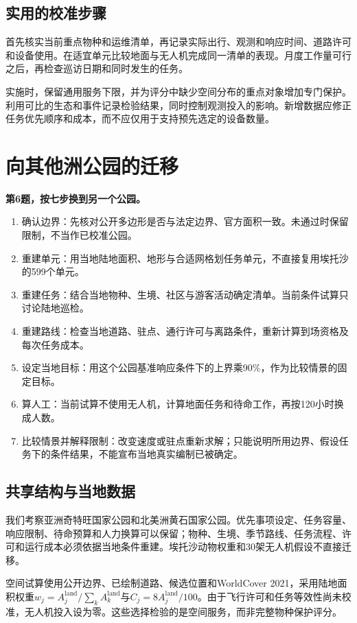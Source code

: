 \documentclass[12pt,a4paper]{article}
\numberwithin{equation}{section}
\begin{document}
\subsection{实用的校准步骤}
首先核实当前重点物种和运维清单，再记录实际出行、观测和响应时间、道路许可和设备使用。在适宜单元比较地面与无人机完成同一清单的表现。月度工作量可行之后，再检查巡访日期和同时发生的任务。

实施时，保留通用服务下限，并为评分中缺少空间分布的重点对象增加专门保护。利用可比的生态和事件记录检验结果，同时控制观测投入的影响。新增数据应修正任务优先顺序和成本，而不应仅用于支持预先选定的设备数量。
\clearpage

\section{向其他洲公园的迁移}
\noindent\textbf{第6题，按七步换到另一个公园。}
\begin{enumerate}
\item 确认边界：先核对公开多边形是否与法定边界、官方面积一致。未通过时保留限制，不当作已校准公园。
\item 重建单元：用当地陆地面积、地形与合适网格划任务单元，不直接复用埃托沙的599个单元。
\item 重建任务：结合当地物种、生境、社区与游客活动确定清单。当前条件试算只讨论陆地巡检。
\item 重建路线：检查当地道路、驻点、通行许可与离路条件，重新计算到场资格及每次任务成本。
\item 设定当地目标：用这个公园基准响应条件下的上界乘90\%，作为比较情景的固定目标。
\item 算人工：当前试算不使用无人机，计算地面任务和待命工作，再按120小时换成人数。
\item 比较情景并解释限制：改变速度或驻点重新求解；只能说明所用边界、假设任务下的条件结果，不能宣布当地真实编制已被确定。
\end{enumerate}

\subsection{共享结构与当地数据}
我们考察亚洲奇特旺国家公园和北美洲黄石国家公园。优先事项设定、任务容量、响应限制、待命预算和人力换算可以保留；物种、生境、季节路线、任务流程、许可和运行成本必须依据当地条件重建。埃托沙动物权重和30架无人机假设不直接迁移。

空间试算使用公开边界、已绘制道路、候选位置和WorldCover 2021，采用陆地面积权重$w_j=A_j^{\mathrm{land}}/\sum_kA_k^{\mathrm{land}}$与$C_j=8A_j^{\mathrm{land}}/100$。由于飞行许可和任务等效性尚未校准，无人机投入设为零。这些选择检验的是空间服务，而非完整物种保护评分。
\end{document}
